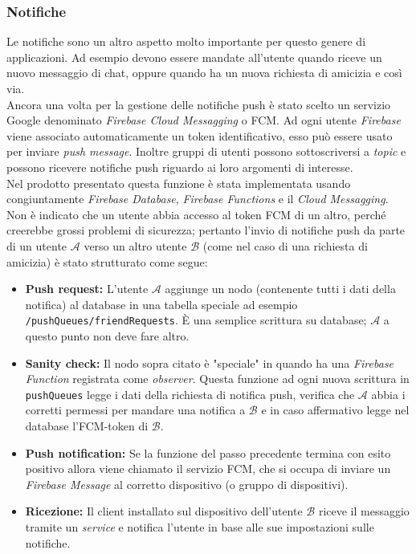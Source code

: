 \documentclass[conference]{IEEEtran}
\begin{document}
		\subsubsection{Notifiche}
			Le notifiche sono un altro aspetto molto importante per questo genere di applicazioni. Ad esempio devono essere mandate
			all'utente quando riceve un nuovo messaggio di chat, oppure quando ha un nuova richiesta di amicizia e così via.\\
			Ancora una volta per la gestione delle notifiche push è stato scelto un servizio Google denominato \textit{Firebase Cloud Messagging} o FCM.
			Ad ogni utente \textit{Firebase} viene associato automaticamente un token identificativo, esso può essere usato per inviare
			\textit{push message}. Inoltre gruppi di utenti possono sottoscriversi a \textit{topic} e possono ricevere notifiche push
			riguardo ai loro argomenti di interesse.\\
			Nel prodotto presentato questa funzione è stata implementata usando congiuntamente \textit{Firebase Database}, \textit{Firebase Functions} e il \textit{Cloud Messagging}.
			Non è indicato che un utente abbia accesso al token FCM di un altro, perché creerebbe grossi problemi di sicurezza; pertanto
			l'invio di notifiche push da parte di un utente $\mathcal{A}$ verso un altro utente $\mathcal{B}$ (come nel caso di una richiesta di amicizia)
			è stato strutturato come segue:
			\begin{itemize}
				\item \textbf{Push request:} L'utente $\mathcal{A}$ aggiunge un nodo (contenente tutti i dati della notifica) al database in una tabella speciale ad esempio
					\texttt{/pushQueues/friendRequests}. È una semplice scrittura su database; $\mathcal{A}$ a questo punto non deve fare altro.
				\item \textbf{Sanity check:} Il nodo sopra citato è "speciale" in quando ha una \textit{Firebase Function} registrata come \textit{observer}.
					Questa funzione ad ogni nuova scrittura in \texttt{pushQueues} legge i dati della richiesta di notifica push, verifica che $\mathcal{A}$ abbia
					i corretti permessi per mandare una notifica a $\mathcal{B}$ e in caso affermativo legge nel database l'FCM-token di $\mathcal{B}$.
				\item \textbf{Push notification:} Se la funzione del passo precedente termina con esito positivo allora viene chiamato il servizio FCM, che si occupa
					di inviare un \textit{Firebase Message} al corretto dispositivo (o gruppo di dispositivi).
				\item \textbf{Ricezione:} Il client installato sul dispositivo dell'utente $\mathcal{B}$ riceve il messaggio tramite un \textit{service} e notifica
					l'utente in base alle sue impostazioni sulle notifiche.
			\end{itemize}
\end{document}

